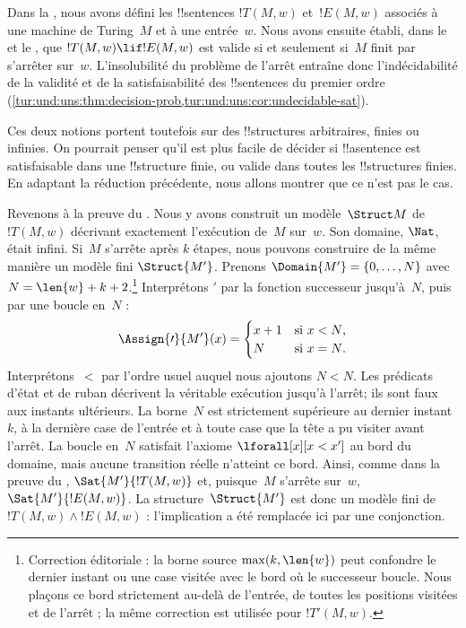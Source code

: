 \documentclass[../../../include/open-logic-section]{subfiles}
\begin{document}

\begin{explain}
Dans la , nous avons défini les !!{sentence}s
$!T(M,w)$ et~$!E(M,w)$ associés à une machine de Turing~$M$ et
à une entrée~$w$. Nous avons ensuite établi, dans
le  et
le , que
$!T(M,w)\lif !E(M,w)$ est valide si et seulement si~$M$
finit par s'arrêter sur~$w$. L'insolubilité du problème de l'arrêt
entraîne donc l'indécidabilité de la validité et de la
satisfaisabilité des !!{sentence}s du premier ordre
(\cref{tur:und:uns:thm:decision-prob,tur:und:uns:cor:undecidable-sat}).

Ces deux notions portent toutefois sur des !!{structure}s
arbitraires, finies ou infinies. On pourrait penser qu'il est plus
facile de décider si !!a{sentence} est satisfaisable dans une
!!{structure} finie, ou valide dans toutes les !!{structure}s
finies. En adaptant la réduction précédente, nous allons montrer
que ce n'est pas le cas.

Revenons à la preuve du .
Nous y avons construit un modèle~$\Struct M$ de~$!T(M,w)$
décrivant exactement l'exécution de~$M$ sur~$w$. Son domaine,
$\Nat$, était infini. Si~$M$ s'arrête après $k$ étapes, nous
pouvons construire de la même manière un modèle fini
$\Struct{M'}$. Prenons
$\Domain{M'}=\{0,\dots,N\}$ avec
$N=\len{w}+k+2$.\footnote{Correction éditoriale : la borne source $\max(k,\len{w})$ peut confondre le dernier instant ou une case visitée avec le bord où le successeur boucle. Nous plaçons ce bord strictement au-delà de l'entrée, de toutes les positions visitées et de l'arrêt ; la même correction est utilisée pour $!T'(M,w)$.} Interprétons $\prime$ par la fonction successeur
jusqu'à~$N$, puis par une boucle en~$N$ :
\[
\Assign{\prime}{M'}(x)=
\begin{cases}
  x+1 &\text{si $x<N$,}\\
  N &\text{si $x=N$.}
\end{cases}
\]
Interprétons~$<$ par l'ordre usuel auquel nous ajoutons
$N<N$. Les prédicats d'état et de ruban décrivent la véritable
exécution jusqu'à l'arrêt; ils sont faux aux instants ultérieurs.
La borne~$N$ est strictement supérieure au dernier instant~$k$,
à la dernière case de l'entrée et à toute case que la tête a pu
visiter avant l'arrêt. La boucle en~$N$ satisfait l'axiome
$\lforall[x][x<x']$ au bord du domaine, mais aucune transition
réelle n'atteint ce bord. Ainsi, comme dans la preuve du
,
$\Sat{M'}{!T(M,w)}$ et, puisque~$M$ s'arrête sur~$w$,
$\Sat{M'}{!E(M,w)}$. La structure~$\Struct{M'}$ est donc un
modèle fini de $!T(M,w)\land !E(M,w)$ : l'implication a été
remplacée ici par une conjonction.


\end{explain}
\end{document}
